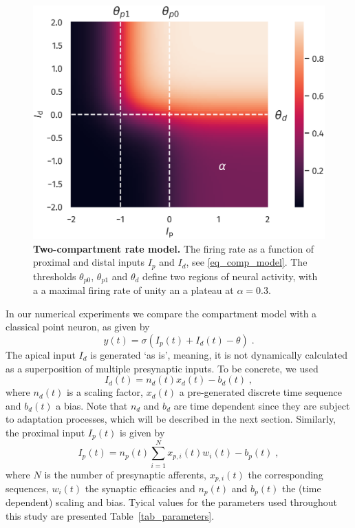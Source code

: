 \documentclass[utf8]{frontiersSCNS} %
\begin{document}
\begin{figure}[t]
\centering
\includegraphics[width=0.6\columnwidth]{plot_comp_mod_marks.png}
\caption{{\bf Two-compartment rate model.} 
The firing rate as a function of proximal and distal 
inputs $I_p$ and $I_d$, 
see \eqref{eq_comp_model}. 
The thresholds $\theta_{p0}$, $\theta_{p1}$ and 
$\theta_d$ define two regions of neural activity,
with a a maximal firing rate of unity an a plateau
at $\alpha=0.3$.}
\label{fig:comp_model}
\end{figure}

In our numerical experiments we compare 
the compartment model with a classical point 
neuron, as given by
\begin{equation}
y(t) = \sigma\left(I_p(t) + I_d(t) - 
\theta \right) \; .
\label{eq_point_neuron}
\end{equation}
The apical input $I_d$ is generated
`as is', meaning, it is not dynamically 
calculated as a superposition of multiple 
presynaptic inputs. To be concrete, we
used
\begin{equation}
I_d(t) = n_d(t) x_d(t) - b_d(t) \; ,
\label{eq_I_d}
\end{equation}
where $n_d(t)$ is a scaling factor, $x_d(t)$ 
a pre-generated discrete time sequence and 
$b_d(t)$ a bias. Note that $n_d$ and $b_d$ 
are time dependent since they are subject 
to adaptation processes, which will be
described in the next section. Similarly, 
the proximal input $I_p(t)$ is given by
\begin{equation}
I_p(t) = n_p(t) \sum_{i=1}^{N} 
x_{p,i}(t) w_i(t) - b_p(t) \; ,
\label{eq_I_p}
\end{equation}
where $N$ is the number of presynaptic afferents, 
$x_{p,i}(t)$ the corresponding sequences, 
$w_i(t)$ the synaptic efficacies and
$n_p(t)$ and $b_p(t)$ the (time dependent)
scaling and bias. Tyical values for the 
parameters used throughout this study
are presented Table~\ref{tab_parameters}.
\end{document}
